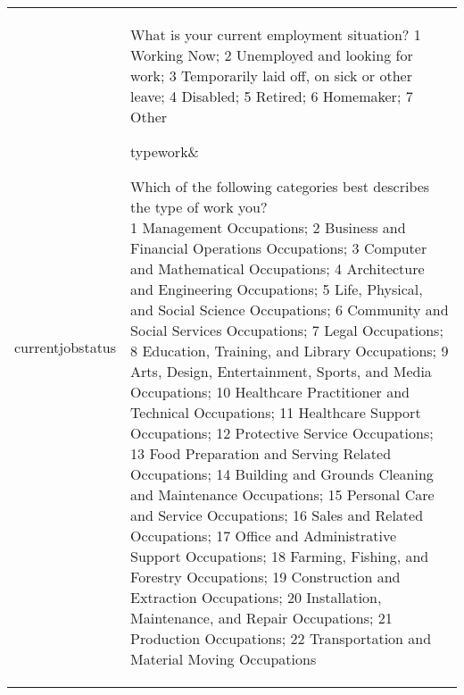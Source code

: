 \begin{table}[!h]
{\begin{tabular}{ll}
currentjobstatus& \parbox[c][0.07\textheight][c]{0.75\textwidth} { What is your current employment situation? 1 Working Now; 2 Unemployed and looking for work; 3 Temporarily laid off, on sick or other leave; 4 Disabled; 5 Retired; 6 Homemaker; 7 Other} \tabularnewline
typework&

\parbox[c][0.25\textheight][c]{0.75\textwidth} { 
Which of the following categories best describes the type of work you?\\
1 Management Occupations; 2 Business and Financial Operations Occupations; 3 Computer and Mathematical Occupations; 4 Architecture and Engineering Occupations; 5 Life, Physical, and Social Science Occupations; 6 Community and Social Services Occupations; 7 Legal Occupations; 8 Education, Training, and Library Occupations; 9 Arts, Design, Entertainment, Sports, and Media Occupations; 10 Healthcare Practitioner and Technical Occupations; 11 Healthcare Support Occupations; 12 Protective Service Occupations; 13 Food Preparation and Serving Related Occupations; 14 Building and Grounds Cleaning and Maintenance Occupations; 15 Personal Care and Service Occupations; 16 Sales and Related Occupations; 17 Office and Administrative Support Occupations; 18 Farming, Fishing, and Forestry Occupations; 19 Construction and Extraction Occupations; 20 Installation, Maintenance, and Repair Occupations; 21 Production Occupations; 22 Transportation and Material Moving Occupations
}


\end{tabular}}
\end{table}
